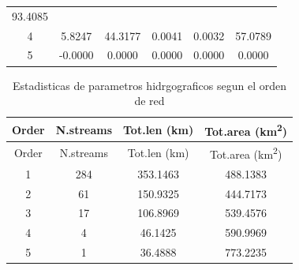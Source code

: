 \documentclass[11pt,]{article}
\begin{document}
\begin{longtable}[]{@{}cccccc@{}}
\begin{minipage}[t]{0.13\columnwidth}
93.4085\strut
\end{minipage}\tabularnewline
\begin{minipage}[t]{0.08\columnwidth}\centering\strut
4\strut
\end{minipage} & \begin{minipage}[t]{0.11\columnwidth}\centering\strut
5.8247\strut
\end{minipage} & \begin{minipage}[t]{0.26\columnwidth}\centering\strut
44.3177\strut
\end{minipage} & \begin{minipage}[t]{0.11\columnwidth}\centering\strut
0.0041\strut
\end{minipage} & \begin{minipage}[t]{0.14\columnwidth}\centering\strut
0.0032\strut
\end{minipage} & \begin{minipage}[t]{0.13\columnwidth}\centering\strut
57.0789\strut
\end{minipage}\tabularnewline
\begin{minipage}[t]{0.08\columnwidth}\centering\strut
5\strut
\end{minipage} & \begin{minipage}[t]{0.11\columnwidth}\centering\strut
-0.0000\strut
\end{minipage} & \begin{minipage}[t]{0.26\columnwidth}\centering\strut
0.0000\strut
\end{minipage} & \begin{minipage}[t]{0.11\columnwidth}\centering\strut
0.0000\strut
\end{minipage} & \begin{minipage}[t]{0.14\columnwidth}\centering\strut
0.0000\strut
\end{minipage} & \begin{minipage}[t]{0.13\columnwidth}\centering\strut
0.0000\strut
\end{minipage}\tabularnewline
\bottomrule
\end{longtable}

\begin{longtable}[]{@{}cccc@{}}
\caption{\label{parh} Estadisticas de parametros hidrgograficos segun el
orden de red}\tabularnewline
\toprule
Order & N.streams & Tot.len (km) & Tot.area
(km\textsuperscript{2})\tabularnewline
\midrule
\endfirsthead
\toprule
Order & N.streams & Tot.len (km) & Tot.area
(km\textsuperscript{2})\tabularnewline
\midrule
\endhead
1 & 284 & 353.1463 & 488.1383\tabularnewline
2 & 61 & 150.9325 & 444.7173\tabularnewline
3 & 17 & 106.8969 & 539.4576\tabularnewline
4 & 4 & 46.1425 & 590.9969\tabularnewline
5 & 1 & 36.4888 & 773.2235\tabularnewline
\bottomrule
\end{longtable}
\end{document}
